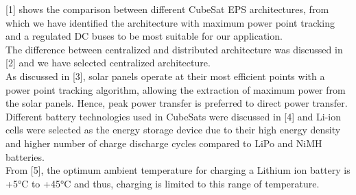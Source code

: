  [1] shows the comparison between different CubeSat EPS architectures, from which we have identified the architecture with maximum power point tracking and a regulated DC buses to be most suitable for our application.
\\

The difference between centralized and distributed architecture was discussed in [2] and we have selected centralized architecture.
\\

As discussed in [3], solar panels operate at their most efficient points with a power point tracking algorithm, allowing the extraction of maximum power from the solar panels. Hence, peak power transfer is preferred to direct power transfer.
\\

Different battery technologies used in CubeSats were discussed in [4] and Li-ion cells were selected as the energy storage device due to their high energy density and higher number of charge discharge cycles compared to LiPo and NiMH batteries.
\\

From [5], the optimum ambient temperature for charging a Lithium ion battery is +5°C to +45°C and thus, charging is limited to this range of temperature.